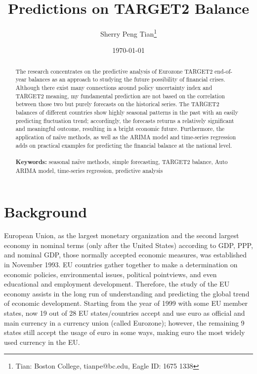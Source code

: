 \documentclass[12pt]{article}
\begin{document}
\begin{titlepage}
\title{Predictions on TARGET2 Balance}
\author{Sherry Peng Tian\thanks{Tian: Boston College, tianpe@bc.edu, Eagle ID: 1675 1338}}
\date{\today}
\maketitle
\begin{abstract}
\noindent The research concentrates on the predictive analysis of Eurozone TARGET2 end-of-year balances as an approach to studying the future possibility of financial crises. Although there exist many connections around policy uncertainty index and TARGET2 meaning, my fundamental prediction are not based on the correlation between those two but purely forecasts on the historical series. The TARGET2 balances of different countries show highly seasonal patterns in the past with an easily predicting fluctuation trend; accordingly, the forecasts returns a relatively significant and meaningful outcome, resulting in a bright economic future. Furthermore, the application of naïve methods, as well as the ARIMA model and time-series regression adds on practical examples for predicting the financial balance at the national level. \\   
\vspace{0in}\\
\noindent\textbf{Keywords:} seasonal naïve methods, simple forecasting, TARGET2 balance, Auto ARIMA model, time-series regression, predictive analysis\\
\bigskip
\end{abstract}
\setcounter{page}{0}
\thispagestyle{empty}
\end{titlepage}

\pagebreak \newpage
\doublespacing


\section{Background} \label{sec:background}

European Union, as the largest monetary organization and the second largest economy in nominal terms (only after the United States) according to GDP, PPP, and nominal GDP, those normally accepted economic measures, was established in November 1993. EU countries gather together to make a determination on economic policies, environmental issues, political pointviews, and even educational and employment development. Therefore, the study of the EU economy assists in the long run of understanding and predicting the global trend of economic development. Starting from the year of 1999 with some EU member states, now 19 out of 28 EU states/countries accept and use euro as official and main currency in a currency union (called Eurozone); however, the remaining 9 states still accept the usage of euro in some ways, making euro the most widely used currency in the EU. 
\end{document}
